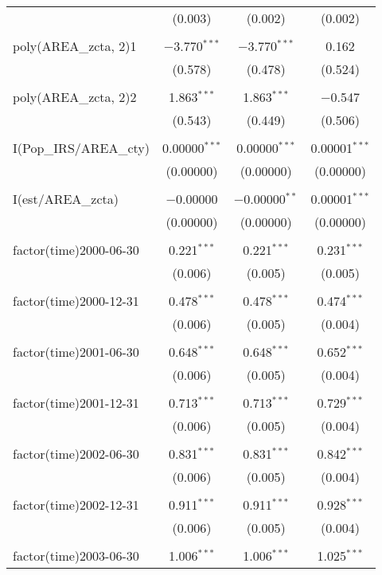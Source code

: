 \begin{table}[!htbp]
\begin{tabular}{@{\extracolsep{5pt}}lccc}
  & (0.003) & (0.002) & (0.002) \\ 
  & & & \\ 
 poly(AREA\_zcta, 2)1 & $-$3.770$^{***}$ & $-$3.770$^{***}$ & 0.162 \\ 
  & (0.578) & (0.478) & (0.524) \\ 
  & & & \\ 
 poly(AREA\_zcta, 2)2 & 1.863$^{***}$ & 1.863$^{***}$ & $-$0.547 \\ 
  & (0.543) & (0.449) & (0.506) \\ 
  & & & \\ 
 I(Pop\_IRS/AREA\_cty) & 0.00000$^{***}$ & 0.00000$^{***}$ & 0.00001$^{***}$ \\ 
  & (0.00000) & (0.00000) & (0.00000) \\ 
  & & & \\ 
 I(est/AREA\_zcta) & $-$0.00000 & $-$0.00000$^{**}$ & 0.00001$^{***}$ \\ 
  & (0.00000) & (0.00000) & (0.00000) \\ 
  & & & \\ 
 factor(time)2000-06-30 & 0.221$^{***}$ & 0.221$^{***}$ & 0.231$^{***}$ \\ 
  & (0.006) & (0.005) & (0.005) \\ 
  & & & \\ 
 factor(time)2000-12-31 & 0.478$^{***}$ & 0.478$^{***}$ & 0.474$^{***}$ \\ 
  & (0.006) & (0.005) & (0.004) \\ 
  & & & \\ 
 factor(time)2001-06-30 & 0.648$^{***}$ & 0.648$^{***}$ & 0.652$^{***}$ \\ 
  & (0.006) & (0.005) & (0.004) \\ 
  & & & \\ 
 factor(time)2001-12-31 & 0.713$^{***}$ & 0.713$^{***}$ & 0.729$^{***}$ \\ 
  & (0.006) & (0.005) & (0.004) \\ 
  & & & \\ 
 factor(time)2002-06-30 & 0.831$^{***}$ & 0.831$^{***}$ & 0.842$^{***}$ \\ 
  & (0.006) & (0.005) & (0.004) \\ 
  & & & \\ 
 factor(time)2002-12-31 & 0.911$^{***}$ & 0.911$^{***}$ & 0.928$^{***}$ \\ 
  & (0.006) & (0.005) & (0.004) \\ 
  & & & \\ 
 factor(time)2003-06-30 & 1.006$^{***}$ & 1.006$^{***}$ & 1.025$^{***}$ \\ 

\end{tabular}
\end{table}
